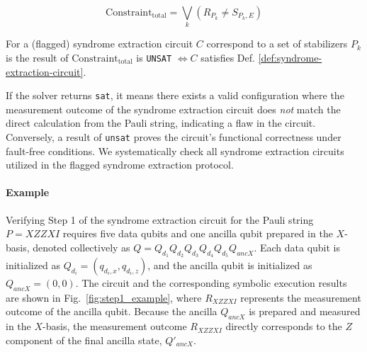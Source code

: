 \documentclass[acmsmallw,review]{acmart}
\begin{document}
\begin{equation}
\mathrm{Constraint}_{\mathrm{total}} = \bigvee_k (R_{P_k} \neq S_{P_k,E})
\end{equation}


\begin{lemma}
    For a (flagged) syndrome extraction circuit $C$ correspond to a set of stabilizers ${P_k}$ is the result of $\mathrm{Constraint}_{\mathrm{total}}$ is \texttt{UNSAT} $\Leftrightarrow C$ satisfies Def. \ref{def:syndrome-extraction-circuit}.
\end{lemma}
If the solver returns \texttt{sat}, it means there exists a valid configuration where the measurement outcome of the syndrome extraction circuit does \emph{not} match the direct calculation from the Pauli string, indicating a flaw in the circuit. Conversely, a result of \texttt{unsat} proves the circuit's functional correctness under fault-free conditions. We systematically check all syndrome extraction circuits utilized in the flagged syndrome extraction protocol.

\paragraph{\textbf{Example}}
Verifying Step 1 of the syndrome extraction circuit for the Pauli string $P=XZZXI$ requires five data qubits and one ancilla qubit prepared in the $X$-basis, denoted collectively as $Q = Q_{d_1} Q_{d_2} Q_{d_3} Q_{d_4} Q_{d_5} Q_{ancX}$. Each data qubit is initialized as $Q_{d_i} = (q_{d_i,x}, q_{d_i,z})$, and the ancilla qubit is initialized as $Q_{ancX} = (0,0)$. The circuit and the corresponding symbolic execution results are shown in Fig.~\ref{fig:step1_example}, where $R_{XZZXI}$ represents the measurement outcome of the ancilla qubit. Because the ancilla $Q_{ancX}$ is prepared and measured in the $X$-basis, the measurement outcome $R_{XZZXI}$ directly corresponds to the $Z$ component of the final ancilla state, $Q'_{ancX}$. 
\end{document}
